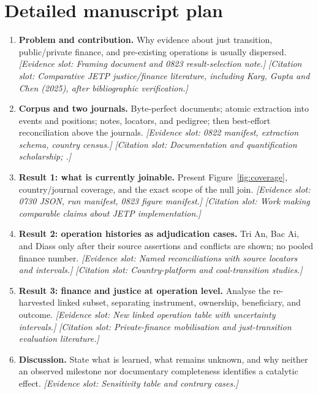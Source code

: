 \documentclass[11pt]{article}
\newcommand{\evidenceslot}[1]{\textit{[Evidence slot: #1]}}
\newcommand{\citationslot}[1]{\textit{[Citation slot: #1]}}
\begin{document}
\section*{Detailed manuscript plan}
\begin{enumerate}
  \item \textbf{Problem and contribution.} Why evidence about just transition,
  public/private finance, and pre-existing operations is usually dispersed.
  \evidenceslot{Framing document and 0823 result-selection note.}
  \citationslot{Comparative JETP justice/finance literature, including Karg,
  Gupta and Chen (2025), after bibliographic verification.}

  \item \textbf{Corpus and two journals.} Byte-perfect documents; atomic
  extraction into events and positions; notes, locators, and pedigree; then
  best-effort reconciliation above the journals. \evidenceslot{0822 manifest,
  extraction schema, country census.} \citationslot{Documentation and
  quantification scholarship; \citealp{desrosieres1998}.}

  \item \textbf{Result 1: what is currently joinable.} Present
  Figure~\ref{fig:coverage}, country/journal coverage, and the exact scope of
  the null join. \evidenceslot{0730 JSON, run manifest, 0823 figure manifest.}
  \citationslot{Work making comparable claims about JETP implementation.}

  \item \textbf{Result 2: operation histories as adjudication cases.} Tri An,
  Bac Ai, and Diass only after their source assertions and conflicts are shown;
  no pooled finance number. \evidenceslot{Named reconciliations with source
  locators and intervals.} \citationslot{Country-platform and coal-transition
  studies.}

  \item \textbf{Result 3: finance and justice at operation level.} Analyse the
  re-harvested linked subset, separating instrument, ownership, beneficiary,
  and outcome. \evidenceslot{New linked operation table with uncertainty
  intervals.} \citationslot{Private-finance mobilisation and just-transition
  evaluation literature.}

  \item \textbf{Discussion.} State what is learned, what remains unknown, and
  why neither an observed milestone nor documentary completeness identifies a
  catalytic effect. \evidenceslot{Sensitivity table and contrary cases.}
\end{enumerate}
\end{document}

